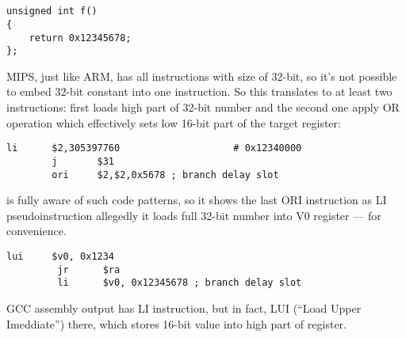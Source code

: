 ﻿\ifx\RUSSIAN\undefined
\section{}

\begin{lstlisting}
unsigned int f()
{
	return 0x12345678;
};
\end{lstlisting}

MIPS, just like ARM, has all instructions with size of 32-bit, so it's not possible to
embed 32-bit constant into one instruction.
So this translates to at least two instructions: 
first loads high part of 32-bit number and the second
one apply OR operation which effectively sets low 16-bit part of the target register:

\begin{lstlisting}[caption=GCC 4.4.5 -O3 (\assemblyOutput)]
        li      $2,305397760                    # 0x12340000
        j       $31
        ori     $2,$2,0x5678 ; branch delay slot
\end{lstlisting}

\IDA is fully aware of such code patterns, so it shows the last ORI instruction as LI pseudoinstruction
allegedly it loads full 32-bit number into V0 register --- for convenience.


\begin{lstlisting}[caption=GCC 4.4.5 -O3 (IDA)]
         lui     $v0, 0x1234
         jr      $ra
         li      $v0, 0x12345678 ; branch delay slot
\end{lstlisting}

GCC assembly output has LI instruction, but in fact, LUI (``Load Upper Imeddiate'') there,
which stores 16-bit value into high part of register.

\fi

